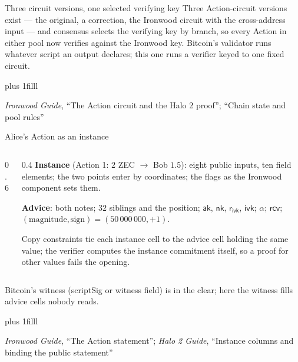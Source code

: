 \documentclass[aspectratio=169,11pt]{beamer}
\newcommand{\aksym}{\ensuremath{\mathsf{ak}}}
\newcommand{\nksym}{\ensuremath{\mathsf{nk}}}
\newcommand{\ivk}{\ensuremath{\mathsf{ivk}}}
\newcommand{\rcv}{\ensuremath{\mathsf{rcv}}}
\newcommand{\rivk}{\ensuremath{\mathsf{r_{ivk}}}}
\newcommand{\src}[1]{\par\vskip0pt plus 1filll
  {\fontsize{6}{7.2}\selectfont\color{arbdim}\raggedright #1\par}}
\begin{document}
\begin{frame}{Three circuit versions, one selected verifying key}
Three Action-circuit versions exist --- the original, a correction, the
Ironwood circuit with the cross-address input --- and consensus selects
the verifying key by branch, so every Action in either pool now verifies
against the Ironwood key. Bitcoin's validator runs whatever script an
output declares; this one runs a verifier keyed to one fixed circuit.
\src{\emph{Ironwood Guide}, ``The Action circuit and the Halo 2 proof''; ``Chain
  state and pool rules''}
\end{frame}

\begin{frame}{Alice's Action as an instance}
\begin{columns}[c]
\begin{column}{0.6\textwidth}
\centering
\GInstanceFig
\end{column}
\begin{column}{0.4\textwidth}
\small
\textbf{Instance} (Action 1: $2$ ZEC $\to$ Bob $1.5$): eight public
inputs, ten field elements; the two points enter by coordinates; the
flags as the Ironwood component sets them.

\vspace{2pt}
\textbf{Advice}: both notes; $32$ siblings and the position;
$\aksym$, $\nksym$, $\rivk$, $\ivk$; $\alpha$; $\rcv$;
$(\mathrm{magnitude}, \mathrm{sign}) = (50\,000\,000, +1)$.

\smallskip
Copy constraints tie each instance cell to the advice cell holding the
same value; the verifier computes the instance commitment itself, so a
proof for other values fails the opening.
\end{column}
\end{columns}
Bitcoin's witness (scriptSig or witness field) is in the clear; here
the witness fills advice cells nobody reads.
\src{\emph{Ironwood Guide}, ``The Action statement'';
\emph{Halo 2 Guide}, ``Instance columns and binding the public
statement''}
\end{frame}
\end{document}
